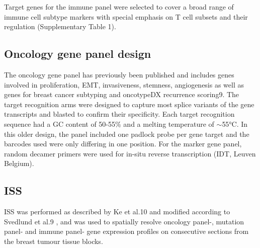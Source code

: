 Target genes for the immune panel were selected to cover a broad range of immune cell subtype markers with special emphasis on T cell subsets and their regulation (Supplementary Table 1).

\subsection{Oncology gene panel design}

The oncology gene panel has previously been published and includes genes involved in proliferation, EMT, invasiveness, stemness, angiogenesis as well as genes for breast cancer subtyping and oncotypeDX recurrence scoring9. The target recognition arms were designed to capture most splice variants of the gene transcripts and blasted to confirm their specificity. Each target recognition sequence had a GC content of 50-55\% and a melting temperature of $\sim$55°C. In this older design, the panel included one padlock probe per gene target and the barcodes used were only differing in one position. For the marker gene panel, random decamer primers were used for in-situ reverse transcription (IDT, Leuven Belgium).

\subsection{\acl{ISS}}

ISS was performed as described by Ke et al.10 and modified according to Svedlund et al.9 , and was used to spatially resolve oncology panel-, mutation panel- and immune panel- gene expression profiles on consecutive sections from the breast tumour tissue blocks. 

